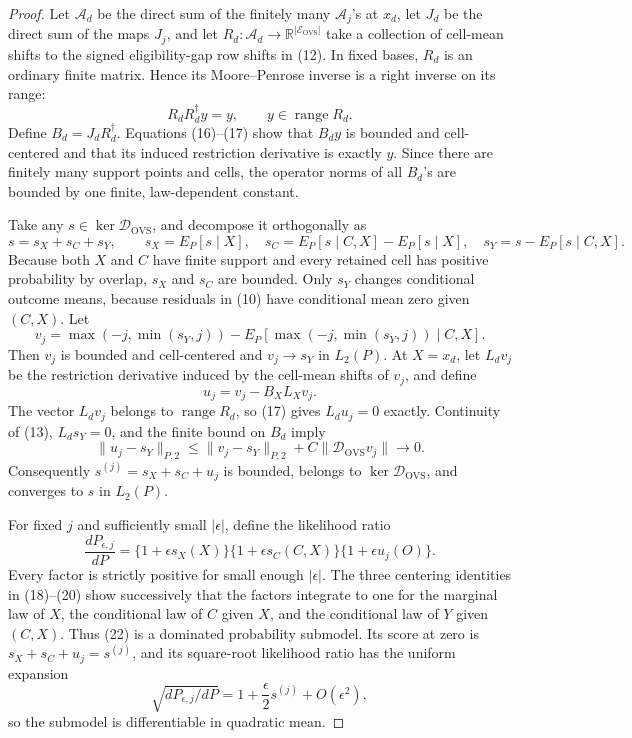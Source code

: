 \documentclass{article}
\begin{document}
\begin{proof}
Let \(\mathcal A_d\) be the direct sum of the finitely many \(\mathcal A_j\)'s at \(x_d\), let \(J_d\) be the direct sum of the maps \(J_j\), and let \(R_d:\mathcal A_d\to\mathbb R^{|\mathcal E_{\mathrm{OVS}}|}\) take a collection of cell-mean shifts to the signed eligibility-gap row shifts in (12).  In fixed bases, \(R_d\) is an ordinary finite matrix.  Hence its Moore--Penrose inverse is a right inverse on its range:
\[
R_dR_d^\dagger y=y,
\qquad y\in\operatorname{range}R_d.
\tag{17}
\]
Define \(B_d=J_dR_d^\dagger\).  Equations (16)--(17) show that \(B_dy\) is bounded and cell-centered and that its induced restriction derivative is exactly \(y\).  Since there are finitely many support points and cells, the operator norms of all \(B_d\)'s are bounded by one finite, law-dependent constant.

Take any \(s\in\ker\mathscr D_{\mathrm{OVS}}\), and decompose it orthogonally as
\[
s=s_X+s_C+s_Y,
\qquad
s_X=E_P[s\mid X],
\quad s_C=E_P[s\mid C,X]-E_P[s\mid X],
\quad s_Y=s-E_P[s\mid C,X].
\tag{18}
\]
Because both \(X\) and \(C\) have finite support and every retained cell has positive probability by overlap, \(s_X\) and \(s_C\) are bounded.  Only \(s_Y\) changes conditional outcome means, because residuals in (10) have conditional mean zero given \((C,X)\).  Let
\[
v_j=\max(-j,\min(s_Y,j))
-E_P[\max(-j,\min(s_Y,j))\mid C,X].
\tag{19}
\]
Then \(v_j\) is bounded and cell-centered and \(v_j\to s_Y\) in \(L_2(P)\).  At \(X=x_d\), let \(L_dv_j\) be the restriction derivative induced by the cell-mean shifts of \(v_j\), and define
\[
u_j=v_j-B_XL_Xv_j.
\tag{20}
\]
The vector \(L_dv_j\) belongs to \(\operatorname{range}R_d\), so (17) gives \(L_du_j=0\) exactly.  Continuity of (13), \(L_ds_Y=0\), and the finite bound on \(B_d\) imply
\[
\|u_j-s_Y\|_{P,2}
\le \|v_j-s_Y\|_{P,2}
+C\|\mathscr D_{\mathrm{OVS}}v_j\|
\longrightarrow0.
\tag{21}
\]
Consequently \(s^{(j)}=s_X+s_C+u_j\) is bounded, belongs to \(\ker\mathscr D_{\mathrm{OVS}}\), and converges to \(s\) in \(L_2(P)\).

For fixed \(j\) and sufficiently small \(|\epsilon|\), define the likelihood ratio
\[
\frac{dP_{\epsilon,j}}{dP}
=\{1+\epsilon s_X(X)\}
 \{1+\epsilon s_C(C,X)\}
 \{1+\epsilon u_j(O)\}.
\tag{22}
\]
Every factor is strictly positive for small enough \(|\epsilon|\).  The three centering identities in (18)--(20) show successively that the factors integrate to one for the marginal law of \(X\), the conditional law of \(C\) given \(X\), and the conditional law of \(Y\) given \((C,X)\).  Thus (22) is a dominated probability submodel.  Its score at zero is \(s_X+s_C+u_j=s^{(j)}\), and its square-root likelihood ratio has the uniform expansion
\[
\sqrt{dP_{\epsilon,j}/dP}
=1+\frac{\epsilon}{2}s^{(j)}+O(\epsilon^2),
\tag{23}
\]
so the submodel is differentiable in quadratic mean.


\end{proof}
\end{document}
